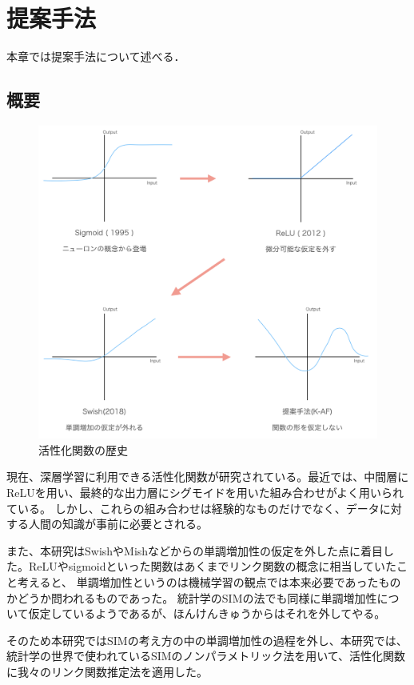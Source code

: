 \chapter{提案手法}
\label{proposed}

本章では提案手法について述べる．

\section{概要}


\begin{figure}[hbtp]
\includegraphics[width=15cm]{asset/history_af.png}
	\caption{活性化関数の歴史}
	\label{history_af}
\end{figure}

現在、深層学習に利用できる活性化関数が研究されている。最近では、中間層にReLUを用い、最終的な出力層にシグモイドを用いた組み合わせがよく用いられている。
しかし、これらの組み合わせは経験的なものだけでなく、データに対する人間の知識が事前に必要とされる。


また、本研究はSwishやMishなどからの単調増加性の仮定を外した点に着目した。ReLUやsigmoidといった関数はあくまでリンク関数の概念に相当していたこと考えると、
単調増加性というのは機械学習の観点では本来必要であったものかどうか問われるものであった。
統計学のSIMの法でも同様に単調増加性について仮定しているようであるが、ほんけんきゅうからはそれを外してやる。

そのため本研究ではSIMの考え方の中の単調増加性の過程を外し、本研究では、統計学の世界で使われているSIMのノンパラメトリック法を用いて、活性化関数に我々のリンク関数推定法を適用した。


